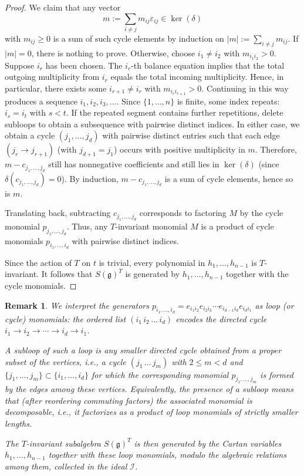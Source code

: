 \documentclass[11pt,reqno]{amsart}
\newtheorem*{theorem A}{Main Theorem A}
\newtheorem*{theorem B}{Main Theorem B}
\newtheorem*{theorem C}{Main Theorem C}
\newtheorem*{theorem D}{Main Theorem D}
\theoremstyle{definition}
\theoremstyle{plain}
\newtheorem{remark}[theorem]{Remark}
\theoremstyle{conclusion}
\begin{document}
\begin{proof}
We claim that any vector $$m := \sum_{i\neq j} m_{ij}\varepsilon_{ij}\in \ker(\delta)$$ with $m_{ij}\geq 0$ is a sum of such cycle elements by induction on $|m| := \sum_{i\neq j} m_{ij}$. If $|m| = 0$, there is nothing to prove. Otherwise, choose $i_1\neq i_2$ with $m_{i_1 i_2}>0$. Suppose $i_r$ has been chosen. The $i_r$-th balance equation implies that the total outgoing multiplicity from $i_r$ equals the total incoming multiplicity. Hence, in particular, there exists some $i_{r+1}\neq i_r$ with $m_{i_r i_{r+1}}>0$. Continuing in this way produces a sequence $i_1,i_2,i_3,\dots$. Since $\{1,\dots,n\}$ is finite, some index repeats: $i_s=i_t$ with $s<t$. If the repeated segment contains further repetitions, delete subloops to obtain a subsequence with pairwise distinct indices. In either case, we obtain a cycle $(j_1, \dots,j_d)$ with pairwise distinct entries such that each edge $(j_r \to j_{r+1})$ (with $j_{d+1} = j_1$) occurs with positive multiplicity in $m$. Therefore, $m - c_{j_1,\dots,j_d}$ still has nonnegative coefficients and still lies in $\ker (\delta)$ (since $\delta (c_{j_1,\dots, j_d})=0$). By induction, $m-c_{j_1,\dots,j_d}$ is a sum of cycle elements, hence so is $m$.

Translating back, subtracting $c_{j_1,\dots,j_d}$ corresponds to factoring $M$ by the cycle monomial $p_{j_1,\dots,j_d}$. Thus, any $T$-invariant monomial $M$ is a product of cycle monomials $p_{i_1,\dots,i_d}$ with pairwise distinct indices.

Since the action of $T$ on $t$ is trivial, every polynomial in $h_1,\dots,h_{n-1}$ is $T$-invariant. It follows that
$S(\mathfrak{g})^T$ is generated by $h_1,\dots,h_{n-1}$ together with the cycle monomials.
\end{proof}

   \begin{remark}
       We interpret the generators $p_{i_1,\dots,i_d}=e_{i_1 i_2}e_{i_2 i_3}\cdots e_{i_{d-1} i_d}e_{i_d i_1}$ as \emph{loop} (or \emph{cycle}) monomials: the ordered list $(i_1\,i_2\,\dots\,i_d)$ encodes the directed cycle $i_1\to i_2 \to \cdots \to i_d\to i_1$.

A \emph{subloop} of such a loop is any smaller directed cycle obtained from a proper subset of the vertices, i.e., a cycle $(j_1\,\dots\,j_m)$ with $2 \leq m < d$ and $\{j_1,\dots,j_m\}\subset\{i_1, \dots, i_d\}$ for which the corresponding monomial $p_{j_1,\dots,j_m}$ is formed by the edges among these vertices. Equivalently, the presence of a subloop means that (after reordering commuting factors) the associated monomial is \emph{decomposable}, i.e., it factorizes as a product of loop monomials of strictly smaller lengths.

The $T$-invariant subalgebra $S(\mathfrak{g})^T$ is then generated by the Cartan variables $h_1,\dots,h_{n-1}$ together with these loop monomials, modulo the algebraic relations among them, collected in the ideal $\mathcal{I}$.
   \end{remark}
 
\end{document}
